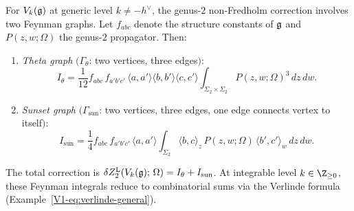 \begin{example}%
%
For $V_k(\mathfrak{g})$ at generic level $k \neq -h^\vee$, the
genus-$2$ non-Fredholm correction involves two Feynman graphs.
Let $f_{abc}$ denote the structure constants of $\mathfrak{g}$
and $P(z,w;\Omega)$ the genus-$2$ propagator. Then:
\begin{enumerate}[label=\textup{(\alph*)}]
\item \emph{Theta graph}
 $(\Gamma_\theta$: two vertices, three edges$)$:
 \begin{equation}%
 I_{\theta}
 = \frac{1}{12}
 f_{abc}\,f_{a'b'c'}\,
 \langle a,a'\rangle\langle b,b'\rangle\langle c,c'\rangle
 \int_{\Sigma_2 \times \Sigma_2}
 P(z,w;\Omega)^3\,dz\,dw.
 \end{equation}
\item \emph{Sunset graph}
 $(\Gamma_{\mathrm{sun}}$: two vertices, three edges,
 one edge connects vertex to itself$)$:
 \begin{equation}%
 I_{\mathrm{sun}}
 = \frac{1}{4}
 f_{abc}\,f_{a'b'c'}\,
 \langle a,a'\rangle
 \int_{\Sigma_2}
 \langle b, c\rangle_z
 \,P(z,w;\Omega)\,
 \langle b', c'\rangle_w\,
 dz\,dw.
 \end{equation}
\end{enumerate}
The total correction is
$\delta Z_2^{\mathrm{L}}(V_k(\mathfrak{g});\,\Omega)
= I_\theta + I_{\mathrm{sun}}$.
At integrable level $k \in \Z_{\geq 0}$, these Feynman
integrals reduce to combinatorial sums via the Verlinde
formula (Example~\ref{V1-eq:verlinde-general}).


\end{example}
